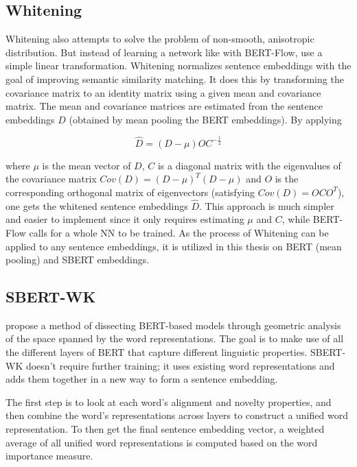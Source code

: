 \subsection{Whitening}\label{whitening}

Whitening also attempts to solve the problem of non-smooth, anisotropic distribution. But instead of learning a network like with BERT-Flow, \citet{huang2021whiteningbert} use a simple linear transformation. Whitening normalizes sentence embeddings with the goal of improving semantic similarity matching. It does this by transforming the covariance matrix to an identity matrix using a given mean and covariance matrix. The mean and covariance matrices are estimated from the sentence embeddings $D$ (obtained by mean pooling the BERT embeddings). By applying

\begin{equation}
    \hat{D}=(D-\mu)OC^{-\frac{1}{2}}
\end{equation}

where $\mu$ is the mean vector of $D$, $C$ is a diagonal matrix with the eigenvalues of the covariance matrix $Cov(D)=(D-\mu)^T(D-\mu)$ and $O$ is the corresponding orthogonal matrix of eigenvectors (satisfying $Cov(D)=OCO^T$), one gets the whitened sentence embeddings $\hat{D}$.
This approach is much simpler and easier to implement since it only requires estimating $\mu$ and $C$, while BERT-Flow calls for a whole NN to be trained. As the process of Whitening can be applied to any sentence embeddings, it is utilized in this thesis on BERT (mean pooling) and SBERT embeddings.

\subsection{SBERT-WK}\label{sbert-wk}

\citet{wang2020sbertwk} propose a method of dissecting BERT-based models through geometric analysis of the space spanned by the word representations. The goal is to make use of all the different layers of BERT that capture different linguistic properties. SBERT-WK doesn't require further training; it uses existing word representations and adds them together in a new way to form a sentence embedding.

The first step is to look at each word's alignment and novelty properties, and then combine the word's representations across layers to construct a unified word representation. To then get the final sentence embedding vector, a weighted average of all unified word representations is computed based on the word importance measure.

